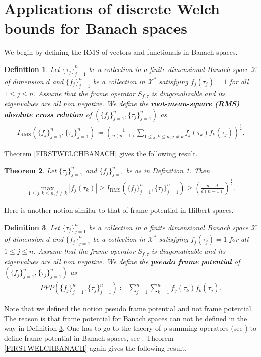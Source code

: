 \documentclass{amsart}
\newtheorem{theorem}{Theorem}[section]
\newtheorem{definition}[theorem]{Definition}
\begin{document}
\section{Applications of discrete Welch bounds for Banach spaces}\label{SECTIONTWO}
We begin by defining the RMS of vectors and functionals in Banach spaces.
 \begin{definition}\label{DISCRETERMS}
	Let $\{\tau_j\}_{j=1}^n$ be a collection in a finite dimensional Banach space $\mathcal{X}$ of dimension $d$  and 	$\{f_j\}_{j=1}^n$ be a collection in  $\mathcal{X}^*$ satisfying $f_j(\tau_j)=1$ for all $1\leq j \leq n$. Assume that  the  frame operator 
	$	S_{f, \tau}$  is diagonalizable and its eigenvalues are all non negative. We define the \textbf{root-mean-square (RMS) absolute cross relation} of    $ (\{f_j \}_{j=1}^n, \{\tau_j \}_{j=1}^n) $ as 
	\begin{align*}
		I_{\text{RMS}} (\{f_j \}_{j=1}^n, \{\tau_j \}_{j=1}^n)\coloneqq \left(\frac{1}{n(n-1)}\sum _{1\leq j,k \leq n, j\neq k} f_j(\tau_k)f_k(\tau_j)\right)^\frac{1}{2}.
	\end{align*}
\end{definition}
Theorem \ref{FIRSTWELCHBANACH}  gives the following result.
\begin{theorem}
	Let $\{\tau_j\}_{j=1}^n$ and $\{f_j\}_{j=1}^n$ be as in Definition \ref{DISCRETERMS}. Then
	\begin{align*}
	\max _{1\leq j,k \leq n, j\neq k}|f_j(\tau_k)| \geq 	I_{\text{RMS}} (\{f_j \}_{j=1}^n, \{\tau_j \}_{j=1}^n)\geq \left(\frac{n-d}{d(n-1)}\right)^\frac{1}{2}.
	\end{align*}
\end{theorem}
Here is another notion similar to that of frame potential in Hilbert spaces.
 \begin{definition}\label{DISCRETEPOTENTIAL}
	Let $\{\tau_j\}_{j=1}^n$ be a collection in a finite dimensional Banach space $\mathcal{X}$ of dimension $d$  and 	$\{f_j\}_{j=1}^n$ be a collection in  $\mathcal{X}^*$ satisfying $f_j(\tau_j)=1$ for all $1\leq j \leq n$. Assume that  the  frame operator 
	$	S_{f, \tau}$  is diagonalizable and its eigenvalues are all non negative. We define the \textbf{pseudo frame potential} of $ (\{f_j \}_{j=1}^n, \{\tau_j \}_{j=1}^n) $ as 
	\begin{align*}
		PFP (\{f_j \}_{j=1}^n, \{\tau_j \}_{j=1}^n)\coloneqq \sum_{j=1}^n\sum_{k=1}^n f_j(\tau_k)f_k(\tau_j).
	\end{align*}
\end{definition}
Note that we defined the notion pseudo frame potential and not frame potential. The reason is that frame potential for Banach spaces can not be defined in the way in Definition \ref{DISCRETEPOTENTIAL}. One has to go to the theory of p-summing operators (see \cite{DIESTELJARCHOWTONGE, NICOLE})  to define frame potential in Banach spaces, see \cite{FREEMANKORNELSON}. Theorem  \ref{FIRSTWELCHBANACH}  again gives the following result.
\end{document}
